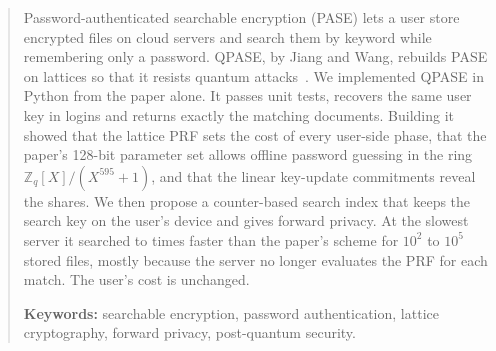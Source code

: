 \begin{abstract}
Password-authenticated searchable encryption (PASE) lets a user store encrypted files on cloud servers and search
them by keyword while remembering only a password. QPASE, by Jiang and Wang, rebuilds PASE on lattices so that it
resists quantum attacks~\cite{jiang2024qpase}. We implemented QPASE in Python from the paper alone. It passes
\UnitTests{} unit tests, recovers the same user key in \LoginsIdentical{} logins and returns exactly the matching
documents. Building it showed that the lattice PRF sets the cost of every user-side phase, that the paper's 128-bit
parameter set allows offline password guessing in the ring $\mathbb{Z}_q[X]/(X^{595}+1)$, and that the linear
key-update commitments reveal the shares. We then propose a counter-based search index that keeps the search key
on the user's device and gives forward privacy. At the slowest server it searched \ScalingSpeedupMin{} to
\ScalingSpeedupMax{} times faster than the paper's scheme for $10^2$ to $10^5$ stored files, mostly because the
server no longer evaluates the PRF for each match. The user's cost is unchanged.

\medskip
\noindent\textbf{Keywords:} searchable encryption, password authentication, lattice cryptography, forward privacy,
post-quantum security.
\end{abstract}
